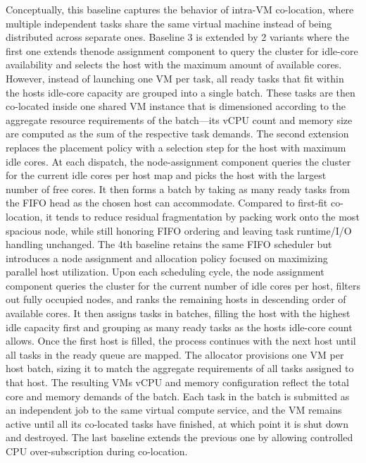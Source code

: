 Conceptually, this baseline captures the behavior of intra-VM co-location, where multiple independent tasks share the same virtual machine instead of being distributed across separate ones.
Baseline 3 is extended by 2 variants where the first one extends thenode assignment component to query the cluster for idle-core availability and selects the host with the maximum amount of available cores. However, instead of launching one VM per task, all ready tasks that fit within the hosts idle-core capacity are grouped into a single batch. These tasks are then co-located inside one shared VM instance that is dimensioned according to the aggregate resource requirements of the batch—its vCPU count and memory size are computed as the sum of the respective task demands.
The second extension replaces the placement policy with a selection step for the host with maximum idle cores. At each dispatch, the node-assignment component queries the cluster for the current idle cores per host map and picks the host with the largest number of free cores. It then forms a batch by taking as many ready tasks from the FIFO head as the chosen host can accommodate. Compared to first-fit co-location, it tends to reduce residual fragmentation by packing work onto the most spacious node, while still honoring FIFO ordering and leaving task runtime/I/O handling unchanged.
The 4th baseline retains the same FIFO scheduler but introduces a node assignment and allocation policy focused on maximizing parallel host utilization. Upon each scheduling cycle, the node assignment component queries the cluster for the current number of idle cores per host, filters out fully occupied nodes, and ranks the remaining hosts in descending order of available cores. It then assigns tasks in batches, filling the host with the highest idle capacity first and grouping as many ready tasks as the hosts idle-core count allows. Once the first host is filled, the process continues with the next host until all tasks in the ready queue are mapped.
The allocator provisions one VM per host batch, sizing it to match the aggregate requirements of all tasks assigned to that host. The resulting VMs vCPU and memory configuration reflect the total core and memory demands of the batch. Each task in the batch is submitted as an independent job to the same virtual compute service, and the VM remains active until all its co-located tasks have finished, at which point it is shut down and destroyed.
The last baseline extends the previous one by allowing controlled CPU over-subscription during co-location.
